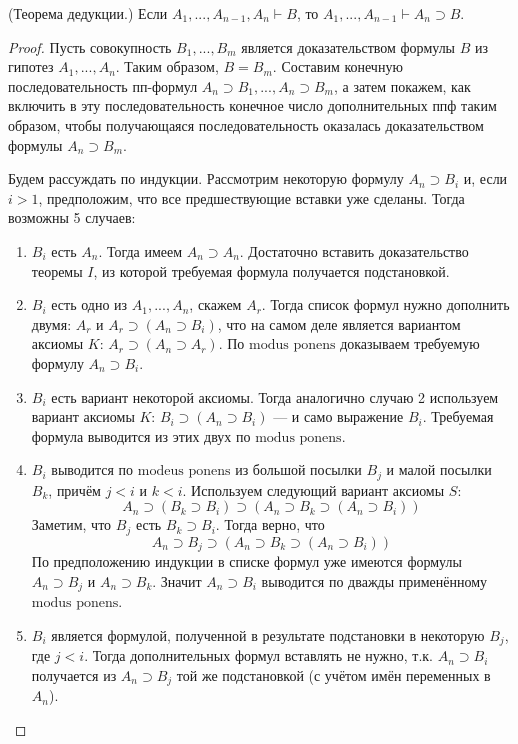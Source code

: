\begin{theorem}
    (Теорема дедукции.) Если $A_1,...,A_{n-1},A_n \vdash B$, то $A_1,...,A_{n-1} \vdash A_n \supset B$.
\end{theorem}
\begin{proof}
    Пусть совокупность $B_1,...,B_m$ является доказательством формулы $B$ из гипотез $A_1,...,A_n$. Таким образом, $B=B_m$. Составим конечную последовательность пп-формул $A_n \supset B_1, ..., A_n\supset B_m$, а затем покажем, как включить в эту последовательность конечное число дополнительных ппф таким образом, чтобы получающаяся последовательность оказалась доказательством формулы $A_n\supset B_m$.

    Будем рассуждать по индукции. Рассмотрим некоторую формулу $A_n \supset B_i$ и, если $i>1$, предположим, что все предшествующие вставки уже сделаны. Тогда возможны 5 случаев:
    \begin{enumerate}
        \item $B_i$ есть $A_n$. Тогда имеем $A_n \supset A_n$. Достаточно вставить доказательство теоремы $I$, из которой требуемая формула получается подстановкой.
        
        \item $B_i$ есть одно из $A_1,...,A_n$, скажем $A_r$. Тогда список формул нужно дополнить двумя: $A_r$ и $A_r \supset (A_n \supset B_i)$, что на самом деле является вариантом аксиомы $K$: $A_r \supset (A_n \supset A_r)$. По $\text{modus ponens}$ доказываем требуемую формулу $A_n \supset B_i$.
        
        \item $B_i$ есть вариант некоторой аксиомы. Тогда аналогично случаю 2 используем вариант аксиомы $K$: $B_i \supset (A_n \supset B_i)$ --- и само выражение $B_i$. Требуемая формула выводится из этих двух по $\text{modus ponens}$.
        
        \item $B_i$ выводится по $\text{modeus ponens}$ из большой посылки $B_j$ и малой посылки $B_k$, причём $j<i$ и $k<i$. Используем следующий вариант аксиомы $S$:
        \begin{equation*}
            A_n \supset (B_k \supset B_i) \supset (A_n \supset B_k \supset (A_n \supset B_i))
        \end{equation*}
        Заметим, что $B_j$ есть $B_k \supset B_i$. Тогда верно, что
        \begin{equation*}
            A_n \supset B_j \supset (A_n \supset B_k \supset (A_n \supset B_i))
        \end{equation*}
        По предположению индукции в списке формул уже имеются формулы $A_n \supset B_j$ и $A_n \supset B_k$. Значит $A_n \supset B_i$ выводится по дважды применённому $\text{modus ponens}$.
        
        \item $B_i$ является формулой, полученной в результате подстановки в некоторую $B_j$, где $j<i$. Тогда дополнительных формул вставлять не нужно, т.к. $A_n \supset B_i$ получается из $A_n \supset B_j$ той же подстановкой (с учётом имён переменных в $A_n$). \qedhere
    \end{enumerate}
\end{proof}


